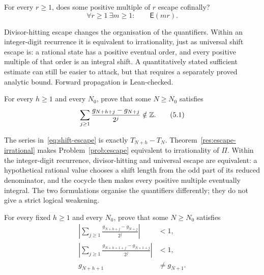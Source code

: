 \documentclass[11pt]{article}
\begin{document}
\begin{problem}\label{prob:divisor-hit}
For every $r\ge1$, does some positive multiple of $r$ escape cofinally?
\[
  \forall r\ge1\ \exists m\ge1:\qquad \mathsf E(mr).
\]
\end{problem}

\noindent Divisor-hitting escape changes the organisation of the
quantifiers.  Within an integer-digit recurrence it is equivalent to
irrationality, just as universal shift escape is: a rational state has a
positive eventual order, and every positive multiple of that order is an
integral shift.  A quantitatively stated sufficient estimate can still be
easier to attack, but that requires a separately proved analytic bound.
Forward propagation is Lean-checked.

\begin{problem}\label{prob:escape}
For every $h\ge1$ and every $N_0$, prove that some $N\ge N_0$ satisfies
\[
 \sum_{j\ge1}
 \frac{g_{N+h+j}-g_{N+j}}{2^j}\notin\Z .
\tag{5.1}\label{eq:shift-escape}
\]
\end{problem}

The series in~\eqref{eq:shift-escape} is exactly $T_{N+h}-T_N$.  Theorem~\ref{res:escape-irrational} makes
Problem~\ref{prob:escape} equivalent to irrationality of $\Pi$.  Within the
integer-digit recurrence, divisor-hitting and universal escape are equivalent:
a hypothetical rational value chooses a shift length from the odd part of its
reduced denominator, and the cocycle then makes every positive multiple
eventually integral.  The two formulations organise the quantifiers
differently; they do not give a strict logical weakening.

\begin{problem}\label{prob:smallpair}
For every fixed $h\ge1$ and every $N_0$, prove that some $N\ge N_0$ satisfies
\[
\begin{split}
\left|\sum_{j\ge1}
 \frac{g_{N+h+j}-g_{N+j}}{2^j}\right|&<1,\\
\left|\sum_{j\ge1}
 \frac{g_{N+h+1+j}-g_{N+1+j}}{2^j}\right|&<1,\\
g_{N+h+1}&\ne g_{N+1}.
\end{split}
\tag{5.2}\label{eq:smallpair}
\]
\end{problem}
\end{document}
